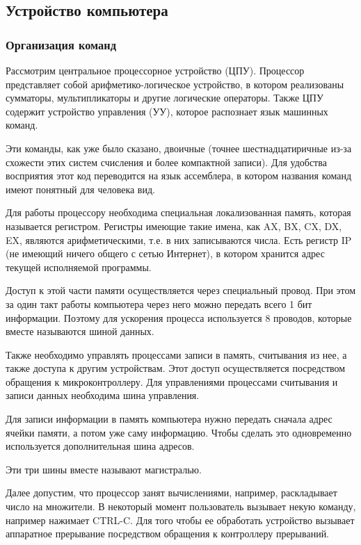 \subsection*{Устройство компьютера}

\subsubsection*{Организация команд}

Рассмотрим центральное процессорное устройство (ЦПУ). Процессор представляет собой арифметико-логическое устройство, в котором реализованы сумматоры, мультипликаторы и другие логические операторы. Также ЦПУ содержит устройство управления (УУ), которое распознает язык машинных команд.

\begin{example}
	Эти команды, как уже было сказано, двоичные (точнее шестнадцатиричные из-за схожести этих систем счисления и более компактной записи).
	Для удобства восприятия этот код переводится на язык ассемблера, в котором названия команд имеют понятный для человека вид.
\end{example}

Для работы процессору необходима специальная локализованная память, которая называется регистром. Регистры имеющие такие имена, как AX, BX, CX, DX, EX, являются арифметическими, т.е. в них записываются числа. Есть регистр IP (не имеющий ничего общего с сетью Интернет), в котором хранится адрес текущей исполняемой программы. 

Доступ к этой части памяти осуществляется через специальный провод. При этом за один такт работы компьютера через него можно передать всего 1 бит информации. Поэтому для ускорения процесса используется 8 проводов, которые вместе называются шиной данных.

Также необходимо управлять процессами записи в память, считывания из нее, а также доступа к другим устройствам. Этот доступ осуществляется посредством обращения к микроконтроллеру. Для управлениями процессами считывания и записи данных необходима шина управления. 

Для записи информации в память компьютера нужно передать сначала адрес ячейки памяти, а потом уже саму информацию. Чтобы сделать это одновременно используется дополнительная шина адресов. 

Эти три шины вместе называют магистралью. 

Далее допустим, что процессор занят вычислениями, например, раскладывает число на множители. В некоторый момент пользователь вызывает некую команду, например нажимает CTRL-C. Для того чтобы ее обработать устройство вызывает аппаратное прерывание посредством обращения к контроллеру прерываний. 

